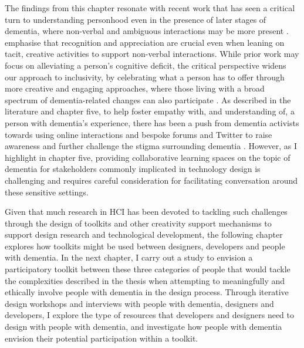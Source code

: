 The findings from this chapter resonate with recent work that has seen a critical turn to understanding personhood even in the presence of later stages of dementia, where non-verbal and ambiguous interactions may be more present \citep{majlesi2017video}. \cite{treadaway_sensor_2016} emphasise that recognition and appreciation are crucial even when leaning on tacit, creative activities to support non-verbal interactions. While prior work may focus on alleviating a person's cognitive deficit, the critical perspective widens our approach to inclusivity, by celebrating what a person has to offer through more creative and engaging approaches, where those living with a broad spectrum of dementia-related changes can also participate \citep{lazar_critical_2017}. As described in the literature and chapter five, to help foster empathy with, and understanding of, a person with dementia's experience, there has been a push from dementia activists towards using online interactions and bespoke forums and Twitter to raise awareness and further challenge the stigma surrounding dementia \citep{talbot_how_2020}. However, as I highlight in chapter five, providing collaborative learning spaces on the topic of dementia for stakeholders commonly implicated in technology design is challenging and requires careful consideration for facilitating conversation around these sensitive settings.

Given that much research in HCI has been devoted to tackling such challenges through the design of toolkits and other creativity support mechanisms to support design research and technological development, the following chapter explores how toolkits might be used between designers, developers and people with dementia. In the next chapter, I carry out a study to envision a participatory toolkit between these three categories of people that would tackle the complexities described in the thesis when attempting to meaningfully and ethically involve people with dementia in the design process. Through iterative design workshops and interviews with people with dementia, designers and developers, I explore the type of resources that developers and designers need to design with people with dementia, and investigate how people with dementia envision their potential participation within a toolkit.

